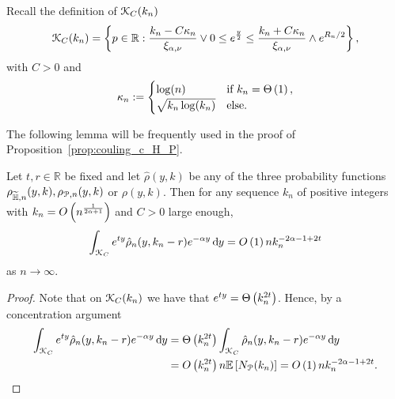 Recall the definition of ${\mathcal K}_{C}(k_n)$
\[
	{\mathcal K}_C(k_n) = \left\{p \in {\ensuremath{\mathbb R}} : \frac{k_n - C \kappa_n}{\xi_{\alpha,\nu}} \vee 0 \le e^{\frac{y}{2}}
	\le \frac{k_n + C \kappa_n}{\xi_{\alpha,\nu}} \wedge e^{R_n/2} \right\},
\]
with $C > 0$ and 
\[
	\kappa_n := \begin{cases}
		\log(n) &\mbox{if } k_n = \Theta\left(1\right),\\
		\sqrt{k_n \log(k_n)} &\mbox{else.}
	\end{cases}
\]

The following lemma will be frequently used in the proof of Proposition~\ref{prop:couling_c_H_P}.

\begin{lemma} \label{lem:gamma_approx}
Let $t, r \in \mathbb{R}$ be fixed and let $\hat{\rho}(y,k)$ be any of the three probability functions $\rho_{\widetilde{\mathbb{H}},n}(y,k), \rho_{{\mathcal P},n}(y,k)$ or $\rho(y,k)$. Then for any sequence $k_n$ of positive integers with $k_n = O\left(n^{\frac{1}{2\alpha + 1}}\right)$ and $C > 0$ large enough,
\[
	\int_{{\mathcal K}_{C}} e^{t y} \hat{\rho}_n(y,k_n-r) e^{-\alpha y} \operatorname{\mathrm{d}\hspace{-2pt}} y = O\left(1\right) n k_n^{-2\alpha - 1 + 2t}
\]
as $n \to \infty$.
\end{lemma}
\begin{proof}
Note that on ${\mathcal K}_{C}(k_n)$ we have that $e^{ty} = \Theta\left(k_n^{2t}\right)$. Hence, by a concentration argument
\begin{align*}
	\int_{{\mathcal K}_{C}} e^{t y} \hat{\rho}_n(y,k_n-r) e^{-\alpha y} \operatorname{\mathrm{d}\hspace{-2pt}} y
	&= \Theta\left(k_n^{2t}\right) \int_{{\mathcal K}_{C}} \hat{\rho}_n(y,k_n-r) e^{-\alpha y} \operatorname{\mathrm{d}\hspace{-2pt}} y\\
	&= O\left(k_n^{2t}\right) n \mathbb{E}\left[N_{{\mathcal P}}(k_n)\right] = O\left(1\right) n k_n^{-2\alpha - 1 + 2t}.
\end{align*}
\end{proof}


